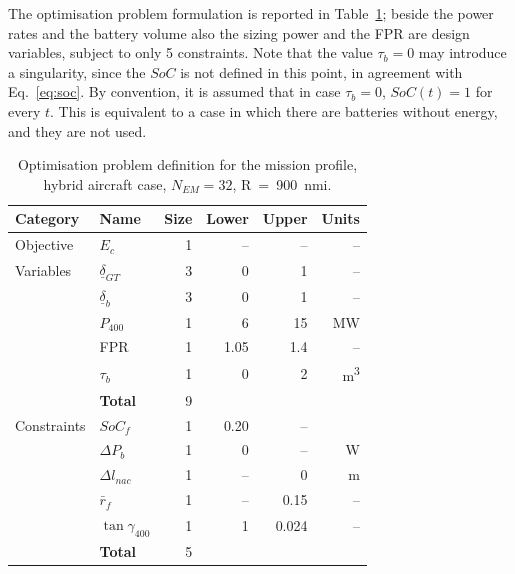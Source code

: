 The optimisation problem formulation is reported in Table~\ref{tab:hybrid_dep_problem_mission_optimisation_definition}; beside the power rates and the battery volume also the sizing power and the FPR are design variables, subject to only 5 constraints.
Note that the value $\tau_{b}=0$ may introduce a singularity, since the $SoC$ is not defined in this point, in agreement with Eq.~\eqref{eq:soc}. 
By convention, it is assumed that in case $\tau_{b}=0$, $SoC(t)=1$ for every $t$.
This is equivalent to a case in which there are batteries without energy, and they are not used. 
\begin{table}[h!]
	\centering
	\begin{tabular}{l l r r r r}
		\hline
		\textbf{Category} & \textbf{Name} & \textbf{Size} & \textbf{Lower} & \textbf{Upper} & \textbf{Units} \\
		\hline
		Objective & $E_c$ & 1 & -- & -- & -- \\
		\hline
		Variables & $\underline{\delta}_{GT}$ & 3 & 0 & 1 & -- \\
		& $\underline{\delta}_{b}$ & 3 & 0 & 1 & -- \\
		& $P_{400}$ & 1 & 6 & 15 & \si{\mega\watt} \\
		& FPR & 1 & 1.05 & 1.4 & -- \\
		& $\tau_{b}$ & 1 & 0 & 2 & \si{\cubic\meter} \\
		& \textbf{Total} & 9 & & & \\
		\hline
		Constraints & $SoC_f$ & 1 & 0.20 & -- &  \\
		& $\Delta P_{b}$ & 1 & \num{0} & -- & \si{\watt} \\
		& $\Delta l_{nac}$ & 1 & -- & \num{0} & \si{\meter} \\
		& $\bar{r}_f$ & 1 & -- & \num{0.15} & -- \\
		& $\tan \gamma_{400}$ & 1 & 1 & \num{0.024} & -- \\
		& \textbf{Total} & 5 & & & \\
		\hline    	
	\end{tabular} 
	\caption{Optimisation problem definition for the mission profile, hybrid aircraft case, $N_{EM}=32$, R~=~900~nmi.}
	\label{tab:hybrid_dep_problem_mission_optimisation_definition}
\end{table}

